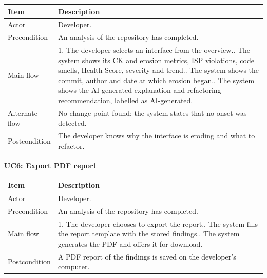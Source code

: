 \documentclass[12pt,a4paper]{article}
\begin{document}
\begin{table}[H]
\centering
\renewcommand{\arraystretch}{1.5}
\setlength{\tabcolsep}{6pt}

\begin{tabular}{|L{1.5in}|L{3.85in}|}
\hline
\textbf{Item} & \textbf{Description} \\
\hline
Actor & Developer. \\
\hline
Precondition & An analysis of the repository has completed. \\
\hline
Main flow & 1. The developer selects an interface from the overview.. The system shows its CK and erosion metrics, ISP violations, code smells, Health Score, severity and trend.. The system shows the commit, author and date at which erosion began.. The system shows the AI-generated explanation and refactoring recommendation, labelled as AI-generated. \\
\hline
Alternate flow & No change point found: the system states that no onset was detected. \\
\hline
Postcondition & The developer knows why the interface is eroding and what to refactor. \\
\hline
\end{tabular}
\end{table}

\begin{spacing}{1.5}
\justifying
\textbf{UC6: Export PDF report}
\end{spacing}

\begin{table}[H]
\centering
\renewcommand{\arraystretch}{1.5}
\setlength{\tabcolsep}{6pt}

\begin{tabular}{|L{1.5in}|L{3.85in}|}
\hline
\textbf{Item} & \textbf{Description} \\
\hline
Actor & Developer. \\
\hline
Precondition & An analysis of the repository has completed. \\
\hline
Main flow & 1. The developer chooses to export the report.. The system fills the report template with the stored findings.. The system generates the PDF and offers it for download. \\
\hline
Postcondition & A PDF report of the findings is saved on the developer's computer. \\
\hline
\end{tabular}
\end{table}
\end{document}
